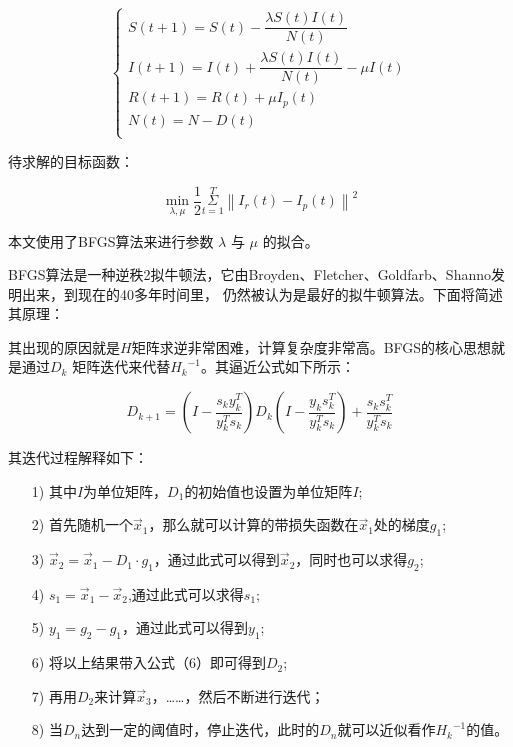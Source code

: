 \documentclass[bwprint]{gmcmthesis}
\numberwithin{figure}{section}
\begin{document}
\begin{equation} \label{}
    \begin{cases}
        S\left( t+1 \right) =S\left( t \right) -\dfrac{\lambda S\left( t \right) I\left( t \right)}{N\left( t \right)}\\
        I\left( t+1 \right) =I\left( t \right) +\dfrac{\lambda S\left( t \right) I\left( t \right)}{N\left( t \right)}-\mu I\left( t \right)\\
        R\left( t+1 \right) =R\left( t \right) +\mu I_p\left( t \right)\\
        N\left( t \right) =N-D\left( t \right)\\
    \end{cases}
\end{equation}


\par 待求解的目标函数：

\begin{equation} \label{}
    \underset{\lambda ,\mu}{\min}\frac{1}{2}\underset{t=1}{\overset{T}{\varSigma}}\left\| I_r\left( t \right) -I_p\left( t \right) \right\| ^2
\end{equation}

\par 本文使用了BFGS算法来进行参数 $\lambda$ 与 $\mu$ 的拟合。

\par BFGS算法是一种逆秩2拟牛顿法，它由Broyden、Fletcher、Goldfarb、Shanno发明出来，到现在的40多年时间里，
仍然被认为是最好的拟牛顿算法。下面将简述其原理：

\par 其出现的原因就是$H$矩阵求逆非常困难，计算复杂度非常高。BFGS的核心思想就是通过$D_k$
矩阵迭代来代替${H_k}^{-1}$。其逼近公式如下所示：

\begin{equation} \label{}
    D_{k+1}=\left( I-\frac{s_ky_{k}^{T}}{y_{k}^{T}s_k} \right) D_k\left( I-\dfrac{y_ks_{k}^{T}}{y_{k}^{T}s_k} \right) +\dfrac{s_ks_{k}^{T}}{y_{k}^{T}s_k}
\end{equation}

\par 其迭代过程解释如下：

\begin{itemize}
    \item[1)] 其中$I$为单位矩阵，$D_1$的初始值也设置为单位矩阵$I$;
    \item[2)] 首先随机一个$\vec{x}_1$，那么就可以计算的带损失函数在$\vec{x}_1$处的梯度$g_1$;
    \item[3)] $\vec{x}_2=\vec{x}_1-D_1\cdot g_1$，通过此式可以得到$\vec{x}_2$，同时也可以求得$g_2$;
    \item[4)] $s_1=\vec{x}_1-\vec{x}_2$,通过此式可以求得$s_1$;
    \item[5)] $y_1=g_2-g_1$，通过此式可以得到$y_1$;
    \item[6)] 将以上结果带入公式（6）即可得到$D_2$;
    \item[7)] 再用$D_2$来计算$\vec{x}_3$，……，然后不断进行迭代；
    \item[8)] 当$D_n$达到一定的阈值时，停止迭代，此时的$D_n$就可以近似看作${H_k}^{-1}$的值。
\end{itemize}
\end{document}
